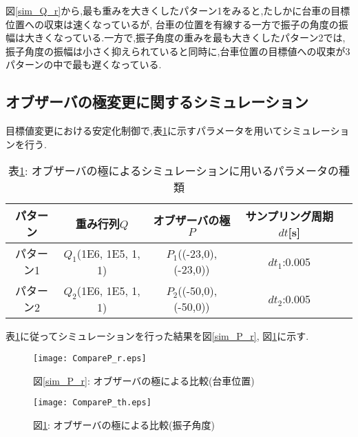図\ref{sim_Q_r}から,最も重みを大きくしたパターン1をみると,たしかに台車の目標位置への収束は速くなっているが,
台車の位置を有線する一方で振子の角度の振幅は大きくなっている.一方で,振子角度の重みを最も大きくしたパターン2では,
振子角度の振幅は小さく抑えられていると同時に,台車位置の目標値への収束が3パターンの中で最も遅くなっている.

\subsection{オブザーバの極変更に関するシミュレーション}
目標値変更における安定化制御で,表\ref{sim_P}に示すパラメータを用いてシミュレーションを行う.

\begin{table}[htbp]
    \begin{center}
        \caption{表\ref{sim_P}: オブザーバの極によるシミュレーションに用いるパラメータの種類}
        \begin{tabular}{|c|c|c|c|c|} \hline
            パターン & 重み行列$Q$ & オブザーバの極$P$ & サンプリング周期$dt$[s] \\ \hline \hline
            パターン1 & $Q_1$(1E6, 1E5, 1, 1) & $P_1$((-23,0), (-23,0)) & $dt_1$:0.005 \\ \hline
            パターン2 & $Q_2$(1E6, 1E5, 1, 1) & $P_2$((-50,0), (-50,0)) & $dt_2$:0.005 \\ \hline
        \end{tabular}
        \label{sim_P}
    \end{center}
\end{table}

表\ref{sim_P}に従ってシミュレーションを行った結果を図\ref{sim_P_r}, 図\ref{sim_P_th}に示す.

\begin{figure}[htbp]
    \begin{minipage}{0.5\hsize}
        \begin{center}
            \texttt{[image: CompareP\_r.eps]}
            \caption{図\ref{sim_P_r}: オブザーバの極による比較(台車位置)}
            \label{sim_P_r}
        \end{center}
    \end{minipage}
    \begin{minipage}{0.5\hsize}
        \begin{center}
            \texttt{[image: CompareP\_th.eps]}
            \caption{図\ref{sim_P_th}: オブザーバの極による比較(振子角度)}
            \label{sim_P_th}
        \end{center}
    \end{minipage}
\end{figure}

